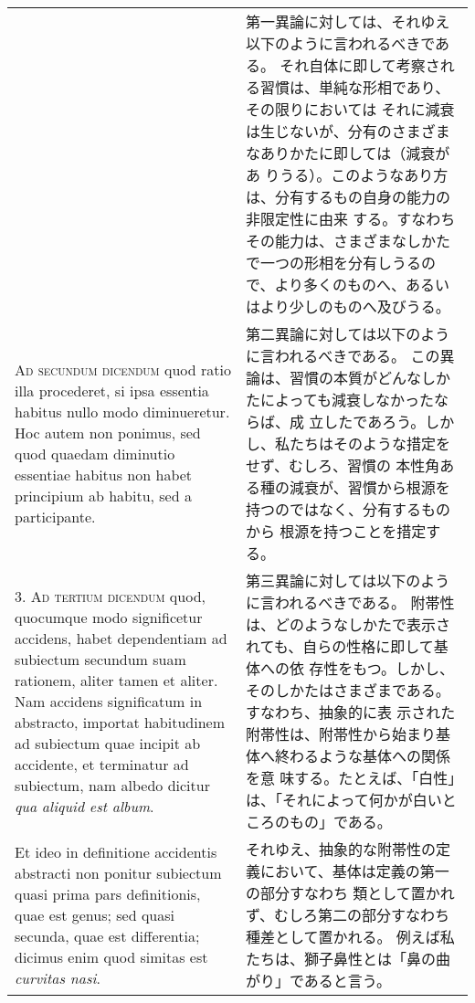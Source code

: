 \documentclass[10pt]{jsarticle} %
\begin{document}
\begin{longtable}{p{21em}p{21em}}
&

第一異論に対しては、それゆえ以下のように言われるべきである。
それ自体に即して考察される習慣は、単純な形相であり、その限りにおいては
 それに減衰は生じないが、分有のさまざまなありかたに即しては（減衰があ
 りうる）。このようなあり方は、分有するもの自身の能力の非限定性に由来
 する。すなわちその能力は、さまざまなしかたで一つの形相を分有しうるの
 で、より多くのものへ、あるいはより少しのものへ及びうる。

\\



{\scshape Ad secundum dicendum} quod ratio illa procederet, si ipsa essentia
habitus nullo modo diminueretur. Hoc autem non ponimus, sed quod
quaedam diminutio essentiae habitus non habet principium ab habitu,
sed a participante.

&

第二異論に対しては以下のように言われるべきである。
この異論は、習慣の本質がどんなしかたによっても減衰しなかったならば、成
 立したであろう。しかし、私たちはそのような措定をせず、むしろ、習慣の
 本性角ある種の減衰が、習慣から根源を持つのではなく、分有するものから
 根源を持つことを措定する。

\\



3. {\scshape Ad tertium dicendum} quod, quocumque modo significetur accidens, habet
dependentiam ad subiectum secundum suam rationem, aliter tamen et
aliter. Nam accidens significatum in abstracto, importat habitudinem
ad subiectum quae incipit ab accidente, et terminatur ad subiectum,
nam albedo dicitur {\itshape qua aliquid est album}. 


&

第三異論に対しては以下のように言われるべきである。
附帯性は、どのようなしかたで表示されても、自らの性格に即して基体への依
 存性をもつ。しかし、そのしかたはさまざまである。すなわち、抽象的に表
 示された附帯性は、附帯性から始まり基体へ終わるような基体への関係を意
 味する。たとえば、「白性」は、「それによって何かが白いところのもの」である。


\\


Et ideo in definitione
accidentis abstracti non ponitur subiectum quasi prima pars
definitionis, quae est genus; sed quasi secunda, quae est differentia;
dicimus enim quod simitas est {\itshape curvitas nasi}. 


&

それゆえ、抽象的な附帯性の定義において、基体は定義の第一の部分すなわち
 類として置かれず、むしろ第二の部分すなわち種差として置かれる。
例えば私たちは、獅子鼻性とは「鼻の曲がり」であると言う。


\end{longtable}
\end{document}
